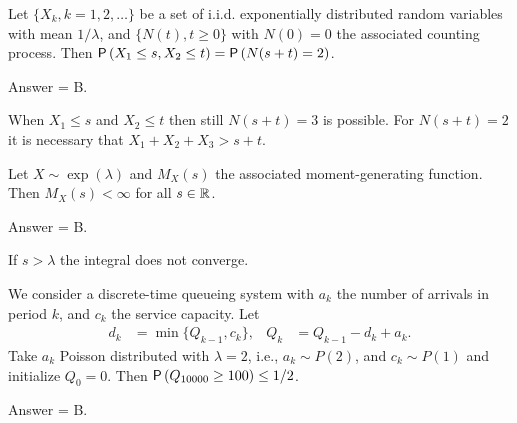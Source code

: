 \begin{exercise}[201903]
Let $\{X_k, k=1, 2, \ldots\}$ be a set of i.i.d. exponentially distributed random variables with mean $1/\lambda$, and $\{N(t), t\geq 0\}$ with  $N(0)=0$ the associated counting process. Then $\P{X_1\leq s, X_2 \leq t} = \P{N(s+t) = 2}$. 
\begin{solution}
  Answer = B.

  When $X_1\leq s$ and $X_2\leq t$ then still $N(s+t)=3$ is possible. For $N(s+t)=2$ it is  necessary that $X_1+X_2 + X_3 > s+t$. 
\end{solution}
\end{exercise}

\begin{exercise}[201903]
Let $X\sim\exp(\lambda)$ and $M_X(s)$ the associated moment-generating function. Then $M_X(s)<\infty$ for all $s\in \mathbb{R}$. 
\begin{solution}
  Answer = B.

  If $s>\lambda$ the integral does not converge. 
\end{solution}
\end{exercise}

\begin{exercise}[201903]
We consider a discrete-time queueing system with $a_k$ the number of arrivals in period $k$, and $c_k$ the service capacity. Let
\begin{align}
d_k &= \min\{Q_{k-1}, c_k\},  & Q_k &= Q_{k-1} -d_k + a_k.
\end{align}
Take $a_k$ Poisson distributed with $\lambda=2$, i.e., $a_k \sim P(2)$, and $c_k\sim P(1)$ and initialize $Q_0 = 0$. Then $\P{Q_{10000} \geq 100} \leq 1/2$. 
\begin{solution}
Answer = B.
\end{solution}
\end{exercise}

